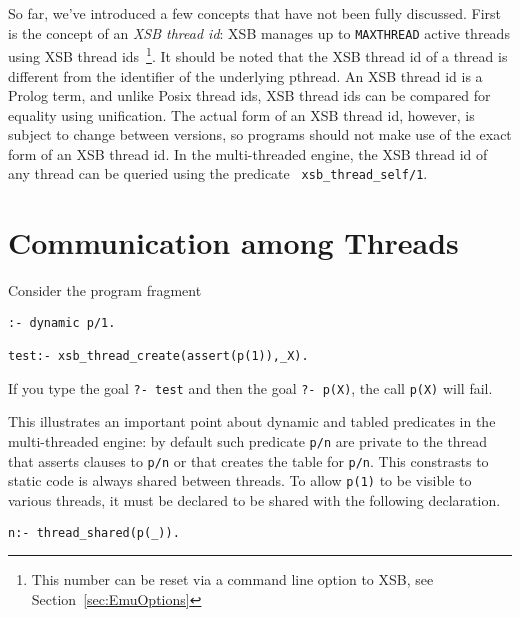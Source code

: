 So far, we've introduced a few concepts that have not been fully
discussed.  First is the concept of an {\em XSB thread id}: XSB
manages up to {\tt MAXTHREAD} active threads using XSB thread
ids~\footnote{This number can be reset via a command line option to
  XSB, see Section~\ref{sec:EmuOptions}}.  It should be noted that the
XSB thread id of a thread is different from the identifier of the
underlying pthread.  An XSB thread id is a Prolog term, and unlike
Posix thread ids, XSB thread ids can be compared for equality using
unification.  The actual form of an XSB thread id, however, is subject
to change between versions, so programs should not make use of the
exact form of an XSB thread id.  In the multi-threaded engine, the XSB
thread id of any thread can be queried using the predicate {\tt
  xsb\_thread\_self/1}.

\section{Communication among Threads}

\begin{example}
Consider the program fragment
%
\begin{verbatim}
:- dynamic p/1.

test:- xsb_thread_create(assert(p(1)),_X).
\end{verbatim}
If you type the goal {\tt ?- test} and then the goal {\tt ?- p(X)},
the call {\tt p(X)} will fail.  
\end{example}

This illustrates an important point about dynamic and tabled
predicates in the multi-threaded engine: by default such predicate
{\tt p/n} are private to the thread that asserts clauses to {\tt p/n}
or that creates the table for {\tt p/n}.  This constrasts to static
code is always shared between threads.  To allow {\tt p(1)} to be
visible to various threads, it must be declared to be shared with the
following declaration.
%
\begin{verbatim}
n:- thread_shared(p(_)).
\end{verbatim}

